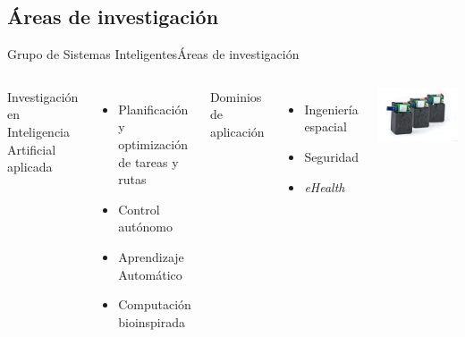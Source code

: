 \documentclass[10pt,compress]{beamer} %
\begin{document}
\subsection{Áreas de investigación}
\begin{frame}{Grupo de Sistemas Inteligentes}{Áreas de investigación}
    \begin{columns}
    		Investigación en Inteligencia Artificial aplicada
    		\begin{itemize}
        		\item Planificación y optimización de tareas y rutas
        		\item Control autónomo
        		\item Aprendizaje Automático
        		\item Computación bioinspirada
        	\end{itemize}

    		Dominios de aplicación
        	\begin{itemize}
        		\item Ingeniería espacial
        		\item Seguridad
        		\item \textit{eHealth}
        	\end{itemize}
        
	 		\includegraphics[width=\textwidth]{figs/sensores}\\
	\end{columns}
    \note{    
    }
\end{frame}
\end{document}
